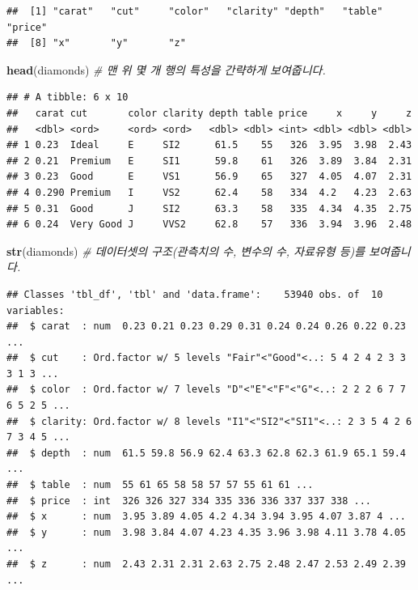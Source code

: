 \documentclass[]{book}
\newenvironment{Shaded}{\begin{snugshade}}{\end{snugshade}}
\newcommand{\CommentTok}[1]{\textcolor[rgb]{0.56,0.35,0.01}{\textit{#1}}}
\newcommand{\KeywordTok}[1]{\textcolor[rgb]{0.13,0.29,0.53}{\textbf{#1}}}
\newcommand{\NormalTok}[1]{#1}
\begin{document}
\begin{verbatim}
##  [1] "carat"   "cut"     "color"   "clarity" "depth"   "table"   "price"  
##  [8] "x"       "y"       "z"
\end{verbatim}

\begin{Shaded}
\begin{Highlighting}[]
\KeywordTok{head}\NormalTok{(diamonds) }\CommentTok{# 맨 위 몇 개 행의 특성을 간략하게 보여줍니다.}
\end{Highlighting}
\end{Shaded}

\begin{verbatim}
## # A tibble: 6 x 10
##   carat cut       color clarity depth table price     x     y     z
##   <dbl> <ord>     <ord> <ord>   <dbl> <dbl> <int> <dbl> <dbl> <dbl>
## 1 0.23  Ideal     E     SI2      61.5    55   326  3.95  3.98  2.43
## 2 0.21  Premium   E     SI1      59.8    61   326  3.89  3.84  2.31
## 3 0.23  Good      E     VS1      56.9    65   327  4.05  4.07  2.31
## 4 0.290 Premium   I     VS2      62.4    58   334  4.2   4.23  2.63
## 5 0.31  Good      J     SI2      63.3    58   335  4.34  4.35  2.75
## 6 0.24  Very Good J     VVS2     62.8    57   336  3.94  3.96  2.48
\end{verbatim}

\begin{Shaded}
\begin{Highlighting}[]
\KeywordTok{str}\NormalTok{(diamonds) }\CommentTok{# 데이터셋의 구조(관측치의 수, 변수의 수, 자료유형 등)를 보여줍니다.}
\end{Highlighting}
\end{Shaded}

\begin{verbatim}
## Classes 'tbl_df', 'tbl' and 'data.frame':    53940 obs. of  10 variables:
##  $ carat  : num  0.23 0.21 0.23 0.29 0.31 0.24 0.24 0.26 0.22 0.23 ...
##  $ cut    : Ord.factor w/ 5 levels "Fair"<"Good"<..: 5 4 2 4 2 3 3 3 1 3 ...
##  $ color  : Ord.factor w/ 7 levels "D"<"E"<"F"<"G"<..: 2 2 2 6 7 7 6 5 2 5 ...
##  $ clarity: Ord.factor w/ 8 levels "I1"<"SI2"<"SI1"<..: 2 3 5 4 2 6 7 3 4 5 ...
##  $ depth  : num  61.5 59.8 56.9 62.4 63.3 62.8 62.3 61.9 65.1 59.4 ...
##  $ table  : num  55 61 65 58 58 57 57 55 61 61 ...
##  $ price  : int  326 326 327 334 335 336 336 337 337 338 ...
##  $ x      : num  3.95 3.89 4.05 4.2 4.34 3.94 3.95 4.07 3.87 4 ...
##  $ y      : num  3.98 3.84 4.07 4.23 4.35 3.96 3.98 4.11 3.78 4.05 ...
##  $ z      : num  2.43 2.31 2.31 2.63 2.75 2.48 2.47 2.53 2.49 2.39 ...
\end{verbatim}
\end{document}
